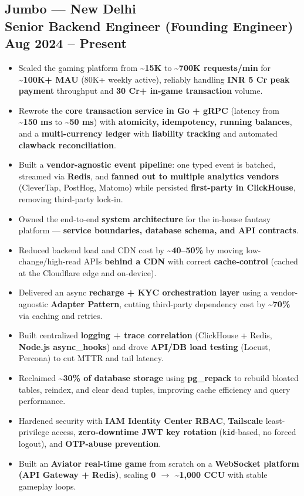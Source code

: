 \documentclass[a4paper,10pt]{article}
\begin{document}
\begin{minipage}[t]{0.60\textwidth}
\subsection*{{\color{accent}Jumbo --- New Delhi}\\ \textnormal{Senior Backend Engineer (Founding Engineer)} \textbar{} Aug 2024 -- Present}
\begin{itemize}
  \item Scaled the gaming platform from \textbf{\textasciitilde{}15K} to \textbf{\textasciitilde{}700K requests/min} for \textbf{\textasciitilde{}100K+ MAU} (80K+ weekly active), reliably handling \textbf{INR 5 Cr peak payment} throughput and \textbf{30 Cr+ in-game transaction} volume.
  \item Rewrote the \textbf{core transaction service in Go + gRPC} (latency from \textbf{\textasciitilde{}150 ms} to \textbf{\textasciitilde{}50 ms}) with \textbf{atomicity, idempotency, running balances}, and a \textbf{multi-currency ledger} with \textbf{liability tracking} and automated \textbf{clawback reconciliation}.
  \item Built a \textbf{vendor-agnostic event pipeline}: one typed event is batched, streamed via \textbf{Redis}, and \textbf{fanned out to multiple analytics vendors} (CleverTap, PostHog, Matomo) while persisted \textbf{first-party in ClickHouse}, removing third-party lock-in.
  \item Owned the end-to-end \textbf{system architecture} for the in-house fantasy platform --- \textbf{service boundaries, database schema, and API contracts}.
  \item Reduced backend load and CDN cost by \textbf{\textasciitilde{}40--50\%} by moving low-change/high-read APIs \textbf{behind a CDN} with correct \textbf{cache-control} (cached at the Cloudflare edge and on-device).
  \item Delivered an async \textbf{recharge + KYC orchestration layer} using a vendor-agnostic \textbf{Adapter Pattern}, cutting third-party dependency cost by \textbf{\textasciitilde{}70\%} via caching and retries.
  \item Built centralized \textbf{logging + trace correlation} (ClickHouse + Redis, \textbf{Node.js async\_hooks}) and drove \textbf{API/DB load testing} (Locust, Percona) to cut MTTR and tail latency.
  \item Reclaimed \textbf{\textasciitilde{}30\% of database storage} using \textbf{pg\_repack} to rebuild bloated tables, reindex, and clear dead tuples, improving cache efficiency and query performance.
  \item Hardened security with \textbf{IAM Identity Center RBAC}, \textbf{Tailscale} least-privilege access, \textbf{zero-downtime JWT key rotation} (\texttt{kid}-based, no forced logout), and \textbf{OTP-abuse prevention}.
  \item Built an \textbf{Aviator real-time game} from scratch on a \textbf{WebSocket platform (API Gateway + Redis)}, scaling \textbf{0 $\rightarrow$ \textasciitilde{}1,000 CCU} with stable gameplay loops.
\end{itemize}


\end{minipage}
\end{document}
